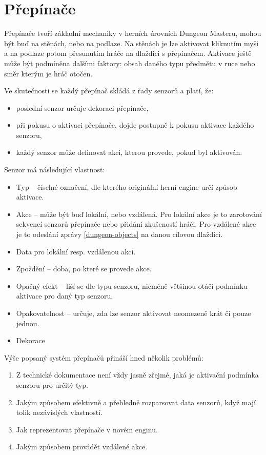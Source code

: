 \section{Přepínače}\label{actuator-analyza}
Přepínače tvoří základní mechaniky v herních úrovních Dungeon Masteru, mohou být buď na stěnách, nebo na podlaze. 
Na stěnách je lze aktivovat kliknutím myši a na podlaze potom přesunutím hráče na dlaždici s přepínačem. Aktivace ještě
může být podmíněna dalšími faktory: obsah daného typu předmětu v ruce nebo směr kterým je hráč otočen.  

Ve skutečnosti se každý přepínač skládá z řady senzorů a platí, že:
\begin{itemize}
\item poslední senzor určuje dekoraci přepínače,
\item při pokusu o aktivaci přepínače, dojde postupně k pokusu aktivace každého senzoru,
\item každý senzor může definovat akci, kterou provede, pokud byl aktivován.
\end{itemize}

Senzor má následující vlastnost:
\begin{itemize}
\item Typ -- číselné označení, dle kterého originální herní engine určí způsob aktivace.
\item Akce -- může být buď lokální, nebo vzdálená. Pro lokální akce je to zarotování sekvencí senzorů 
	přepínače  nebo přidání zkušeností hráči. Pro vzdálené akce je to odeslání zprávy \vref{dungeon-objects} na danou cílovou dlaždici. 
\item Data pro lokální resp. vzdálenou akci.
\item Zpoždění -- doba, po které se provede akce.
\item Opačný efekt -- liší se dle typu senzoru, nicméně většinou otáčí podmínku aktivace pro daný typ senzoru. 
\item Opakovatelnost -- určuje, zda lze senzor aktivovat neomezeně krát či pouze jednou.
\item Dekorace  
\end{itemize}


Výše popsaný systém přepínačů přináší hned několik problémů:
\begin{enumerate}[label=\textbf{P\arabic*}]
\item\label{actuator-unclear} Z technické dokumentace \cite{TechnicalDocumentationFontanel05} není vždy jasně zřejmé, jaká je aktivační podmínka senzoru pro určitý typ.
\item\label{actuator-effective} Jakým způsobem efektivně a přehledně rozparsovat data senzorů, když mají tolik nezávislých vlastností.
\item\label{actuator-representation} Jak reprezentovat přepínače v novém enginu.
\item\label{actuator-remote-actions} Jakým způsobem provádět vzdálené akce.
\end{enumerate}

